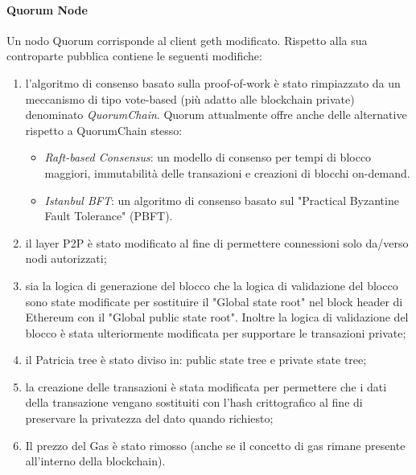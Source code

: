 \paragraph{Quorum Node}
%
Un nodo Quorum corrisponde al client geth modificato. Rispetto alla sua controparte pubblica contiene le seguenti modifiche:
\begin{enumerate}
	\item l'algoritmo di consenso basato sulla proof-of-work è stato rimpiazzato da un meccanismo di tipo vote-based (più adatto alle blockchain private) denominato \emph{QuorumChain}. Quorum attualmente offre anche delle alternative rispetto a QuorumChain stesso:
	      \begin{itemize}
	      	\item \emph{Raft-based Consensus}: un modello di consenso per tempi di blocco maggiori, immutabilità delle transazioni e creazioni di blocchi on-demand.
	      	\item \emph{Istanbul BFT}: un algoritmo di consenso basato sul "Practical Byzantine Fault Tolerance" (PBFT).\cite{pbft}
	      \end{itemize}%
	\item il layer P2P è stato modificato al fine di permettere connessioni solo da/verso nodi autorizzati;
	\item sia la logica di generazione del blocco che la logica di validazione del blocco sono state modificate per sostituire il "Global state root" nel block header di Ethereum con il "Global public state root". Inoltre la logica di validazione del blocco è stata ulteriormente modificata per supportare le transazioni private;
	\item il Patricia tree è stato diviso in: public state tree e private state tree;
	\item la creazione delle transazioni è stata modificata per permettere che i dati della transazione vengano sostituiti con l'hash crittografico al fine di preservare la privatezza del dato quando richiesto;
	\item Il prezzo del Gas è stato rimosso (anche se il concetto di gas rimane presente all'interno della blockchain).
\end{enumerate}%
%
